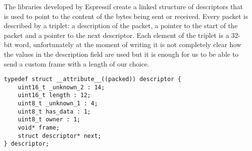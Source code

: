 The libraries developed by Espressif create a linked structure of descriptors that
is used to point to the content of the bytes being sent or received.
Every packet is described by a triplet: a description of the packet, a pointer to the start of the packet
and a pointer to the next descriptor. Each element of the triplet is a 32-bit word, unfortunately
at the moment of writing it is not completely clear how the values in the description field are used
but it is enough for us to be able to send a custom frame with a length of our choice.
\newsavebox{\descriptor}
\begin{lrbox}{\descriptor}
\begin{lstlisting}
typedef struct __attribute__((packed)) descriptor {
	uint16_t _unknown_2 : 14;
	uint16_t length : 12;
	uint8_t _unknown_1 : 4;
	uint8_t has_data : 1;
	uint8_t owner : 1;
	void* frame;
	struct descriptor* next;
} descriptor;
\end{lstlisting}
\end{lrbox}
\usebox{\descriptor}

